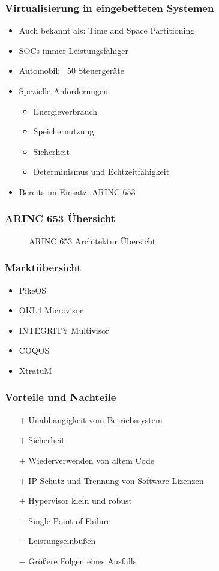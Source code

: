 \documentclass[]{beamer}
\newcommand{\inputImage}[1]{}
\begin{document}
\begin{frame}
\frametitle{Virtualisierung in eingebetteten Systemen}
    \begin{itemize}
        \item Auch bekannt als: Time and Space Partitioning
        \item SOCs immer Leistungsfähiger
        \item Automobil: ~50 Steuergeräte
        \item Spezielle Anforderungen
        \begin{itemize}
            \item Energieverbrauch
            \item Speichernutzung
            \item Sicherheit
            \item Determinismus und Echtzeitfähigkeit
        \end{itemize}
        \item Bereits im Einsatz: ARINC 653
    \end{itemize}
\end{frame}


\begin{frame}
\frametitle{ARINC 653 Übersicht}
    \begin{figure}[ht]
        \centering
        \resizebox{0.65\linewidth}{!}{\inputImage{arinc653.dia}}
        \caption{ARINC 653 Architektur Übersicht}
        \label{fig:arinc_653}
    \end{figure}
\end{frame}

\begin{frame}
\frametitle{Marktübersicht}
    \begin{itemize}
        \item PikeOS
        \item OKL4 Microvisor
        \item INTEGRITY Multivisor
        \item COQOS
        \item XtratuM
    \end{itemize}
\end{frame}

\begin{frame}
\frametitle{Vorteile und Nachteile}
    \begin{itemize}
        \item[$ + $] Unabhängigkeit vom Betriebssystem
        \item[$ + $] Sicherheit
        \item[$ + $] Wiederverwenden von altem Code
        \item[$ + $] IP-Schutz und Trennung von Software-Lizenzen
        \item[$ + $] Hypervisor klein und robust

        \item[$ - $] Single Point of Failure
        \item[$ - $] Leistungseinbußen
        \item[$ - $] Größere Folgen eines Ausfalls
    \end{itemize}
\end{frame}
\end{document}
